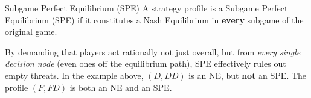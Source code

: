 \documentclass[12pt, a4paper]{article}
\begin{document}
\begin{defbox}{Subgame Perfect Equilibrium (SPE)}
  A strategy profile is a Subgame Perfect Equilibrium (SPE) if it constitutes a Nash Equilibrium in \textbf{every} subgame of the original game.
\end{defbox}

By demanding that players act rationally not just overall, but from \textit{every single decision node} (even ones off the equilibrium path), SPE effectively rules out empty threats. In the example above, $(D, DD)$ is an NE, but \textbf{not} an SPE. The profile $(F, FD)$ is both an NE and an SPE.
\end{document}
